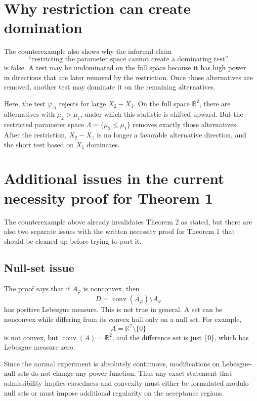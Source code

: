 \documentclass[11pt]{article}
\begin{document}
\section{Why restriction can create domination}

The counterexample also shows why the informal claim
\[
  \text{``restricting the parameter space cannot create a dominating test''}
\]
is false.  A test may be undominated on the full space because it has high power in directions that are later removed by the restriction.  Once those alternatives are removed, another test may dominate it on the remaining alternatives.

Here, the test \(\varphi_\Delta\) rejects for large \(X_2-X_1\).  On the full space \(\mathbb{R}^2\), there are alternatives with \(\mu_2>\mu_1\), under which this statistic is shifted upward.  But the restricted parameter space \(\Lambda=\{\mu_2\le \mu_1\}\) removes exactly those alternatives.  After the restriction, \(X_2-X_1\) is no longer a favorable alternative direction, and the short test based on \(X_1\) dominates.

\section{Additional issues in the current necessity proof for Theorem 1}

The counterexample above already invalidates Theorem 2 as stated, but there are also two separate issues with the written necessity proof for Theorem 1 that should be cleaned up before trying to port it.

\subsection{Null-set issue}

The proof says that if \(A_\varphi\) is nonconvex, then
\[
  D=\operatorname{conv}(A_\varphi)\setminus A_\varphi
\]
has positive Lebesgue measure.  This is not true in general.  A set can be nonconvex while differing from its convex hull only on a null set.  For example,
\[
  A=\mathbb{R}^2\setminus\{0\}
\]
is not convex, but \(\operatorname{conv}(A)=\mathbb{R}^2\), and the difference set is just \(\{0\}\), which has Lebesgue measure zero.

Since the normal experiment is absolutely continuous, modifications on Lebesgue-null sets do not change any power function.  Thus any exact statement that admissibility implies closedness and convexity must either be formulated modulo null sets or must impose additional regularity on the acceptance regions.
\end{document}
